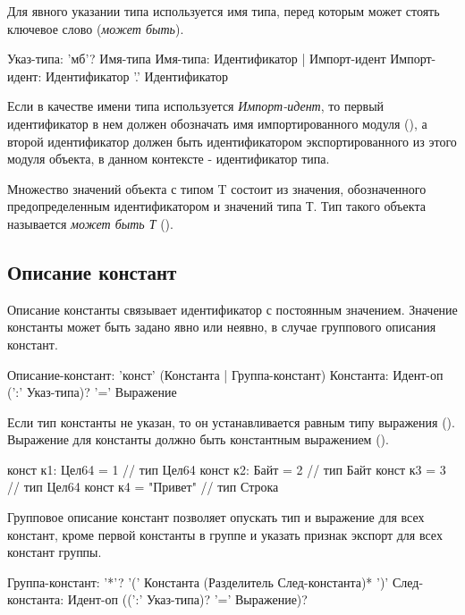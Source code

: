 Для явного указании типа используется имя типа, перед которым может стоять ключевое слово  (\emph{может быть}). 

\begin{Grammar}
Указ-типа: 'мб'? Имя-типа 
Имя-типа: Идентификатор | Импорт-идент
Импорт-идент: Идентификатор '.' Идентификатор
\end{Grammar} 

Если в качестве имени типа используется \emph{Импорт-идент}, то первый идентификатор в нем должен обозначать имя импортированного модуля (), а второй идентификатор должен быть идентификатором экспортированного из этого модуля объекта, в данном контексте - идентификатор типа.

Множество значений объекта с типом  T состоит из значения, обозначенного предопределенным идентификатором   и значений типа Т. 
Тип такого объекта называется \emph{может быть Т} (). 

\hypertarget{constants}{%
\subsection{Описание констант}\label{decls:constants}}

Описание константы связывает идентификатор с постоянным значением. 
Значение константы может быть задано явно или неявно, в случае группового описания констант.

\begin{Grammar}
Описание-констант: 'конст' (Константа | Группа-констант)
Константа: Идент-оп (':' Указ-типа)? '=' Выражение
\end{Grammar} 

Если тип константы не указан, то он устанавливается равным типу выражения ().
Выражение для константы должно быть константным выражением ().

\begin{Trivil}
конст к1: Цел64 = 1 // тип Цел64
конст к2: Байт = 2 // тип Байт
конст к3 = 3 // тип Цел64
конст к4 = "Привет" // тип Строка
\end{Trivil}

Групповое описание констант позволяет опускать тип и выражение для всех констант, кроме первой константы в группе и указать признак экспорт для всех констант группы.

\begin{Grammar}
Группа-констант: 
    '*'? '(' 
    Константа (Разделитель След-константа)* 
    ')'
След-константа: Идент-оп ((':' Указ-типа)? '=' Выражение)?
\end{Grammar} 


